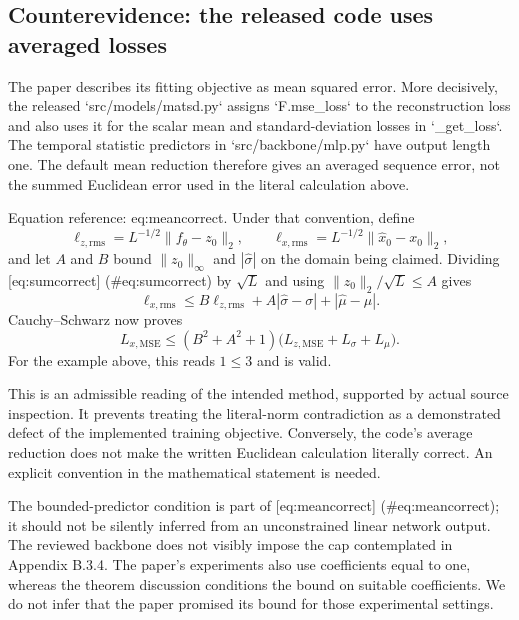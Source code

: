 \documentclass[10pt]{article}
\begin{document}
\subsection*{Counterevidence: the released code uses averaged losses}
The paper describes its fitting objective as mean squared error. More decisively, the released `src/models/matsd.py` assigns `F.mse\_loss` to the reconstruction loss and also uses it for the scalar mean and standard-deviation losses in `\_get\_loss`. The temporal statistic predictors in `src/backbone/mlp.py` have output length one. The default mean reduction therefore gives an averaged sequence error, not the summed Euclidean error used in the literal calculation above.\par
Equation reference: eq:meancorrect. Under that convention, define \[\ell_{z,\mathrm{rms}}=L^{-1/2}\|f_\theta-z_0\|_2,\qquad
\ell_{x,\mathrm{rms}}=L^{-1/2}\|\widehat x_0-x_0\|_2,\] and let \(A\) and \(B\) bound \(\|z_0\|_\infty\) and \(|\widehat\sigma|\) on the domain being claimed. Dividing [eq:sumcorrect] (\#eq:sumcorrect) by \(\sqrt L\) and using \(\|z_0\|_2/\sqrt L\leq A\) gives \[\ell_{x,\mathrm{rms}}\leq
B\ell_{z,\mathrm{rms}}+A|\widehat\sigma-\sigma|
+|\widehat\mu-\mu|.\] Cauchy–Schwarz now proves \[
L_{x,\mathrm{MSE}}\leq
(B^2+A^2+1)
\bigl(L_{z,\mathrm{MSE}}+L_\sigma+L_\mu\bigr).\] For the example above, this reads \(1\leq3\) and is valid.\par
This is an admissible reading of the intended method, supported by actual source inspection. It prevents treating the literal-norm contradiction as a demonstrated defect of the implemented training objective. Conversely, the code’s average reduction does not make the written Euclidean calculation literally correct. An explicit convention in the mathematical statement is needed.\par
The bounded-predictor condition is part of [eq:meancorrect] (\#eq:meancorrect); it should not be silently inferred from an unconstrained linear network output. The reviewed backbone does not visibly impose the cap contemplated in Appendix B.3.4. The paper’s experiments also use coefficients equal to one, whereas the theorem discussion conditions the bound on suitable coefficients. We do not infer that the paper promised its bound for those experimental settings.\par
\end{document}
